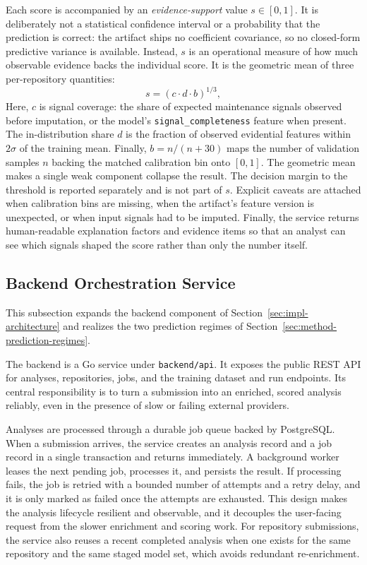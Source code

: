 Each score is accompanied by an \emph{evidence-support} value \(s \in [0,1]\). It is deliberately not a statistical confidence interval or a probability that the prediction is correct: the artifact ships no coefficient covariance, so no closed-form predictive variance is available. Instead, \(s\) is an operational measure of how much observable evidence backs the individual score. It is the geometric mean of three per-repository quantities:
\[
  s = \left( c \cdot d \cdot b \right)^{1/3},
\]
Here, \(c\) is signal coverage: the share of expected maintenance signals
observed before imputation, or the model's \texttt{signal\_completeness} feature
when present. The in-distribution share \(d\) is the fraction of observed
evidential features within \(2\sigma\) of the training mean. Finally,
\(b = n / (n + 30)\) maps the number of validation samples \(n\) backing the
matched calibration bin onto \([0,1]\). The geometric mean makes a single weak
component collapse the result. The decision margin to the threshold is reported
separately and is not part of \(s\). Explicit caveats are attached when
calibration bins are missing, when the artifact's feature version is unexpected,
or when input signals had to be imputed. Finally, the service returns
human-readable explanation factors and evidence items so that an analyst can see
which signals shaped the score rather than only the number itself.

\subsection{Backend Orchestration Service}
\label{sec:impl-backend}

This subsection expands the backend component of Section~\ref{sec:impl-architecture} and realizes the two prediction regimes of Section~\ref{sec:method-prediction-regimes}.

The backend is a Go service under \texttt{backend/api}. It exposes the public REST API for analyses, repositories, jobs, and the training dataset and run endpoints. Its central responsibility is to turn a submission into an enriched, scored analysis reliably, even in the presence of slow or failing external providers.

Analyses are processed through a durable job queue backed by PostgreSQL. When a submission arrives, the service creates an analysis record and a job record in a single transaction and returns immediately. A background worker leases the next pending job, processes it, and persists the result. If processing fails, the job is retried with a bounded number of attempts and a retry delay, and it is only marked as failed once the attempts are exhausted. This design makes the analysis lifecycle resilient and observable, and it decouples the user-facing request from the slower enrichment and scoring work. For repository submissions, the service also reuses a recent completed analysis when one exists for the same repository and the same staged model set, which avoids redundant re-enrichment.

